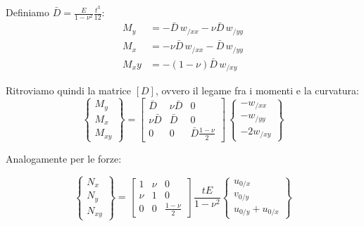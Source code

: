 Definiamo $\bar{D}=\frac{E}{1-\nu^2}\frac{t^3}{12}$:
\begin{align*}
     M_y &= -\bar{D}\,w_{/xx} -\nu \bar{D}\,w_{/yy}\\
     M_x &= -\nu \bar{D}\,w_{/xx} - \bar{D}\,w_{/yy}\\
     M_xy &= -(1-\nu)\bar{D}\,w_{/xy} 
\end{align*}

Ritroviamo quindi la matrice $[D]$, ovvero il legame fra i momenti e la curvatura:
\begin{equation*}
\left\{
\begin{array}{c}
M_y \\
M_x\\
M_{xy}
\end{array}
\right\} =
\left[
\begin{array}{ccc}
\displaystyle \bar{D} & \displaystyle \nu\bar{D} & \displaystyle 0\\
\displaystyle \nu\bar{D} & \displaystyle \bar{D} & \displaystyle 0 \\
\displaystyle 0& \displaystyle 0 & \displaystyle \bar{D}\frac{1-\nu}{2}
\end{array}
\right]\,
\left\{
\begin{array}{c}
-w_{/xx} \\
-w_{/yy}\\
-2w_{/xy}
\end{array}
\right\} 
\end{equation*}

Analogamente per le forze:

\begin{equation*}
\left\{
\begin{array}{c}
N_x \\
N_y\\
N_{xy}
\end{array}
\right\} =
\left[
\begin{array}{ccc}
\displaystyle 1 & \displaystyle \nu & \displaystyle 0\\
\displaystyle \nu & \displaystyle 1 & \displaystyle 0 \\
\displaystyle 0& \displaystyle 0 & \displaystyle \frac{1-\nu}{2}
\end{array}
\right]\, \frac{tE}{1-\nu^2}
\left\{
\begin{array}{c}
u_{0/x} \\
v_{0/y}\\
u_{0/y}+u_{0/x}
\end{array}
\right\} 
\end{equation*}








